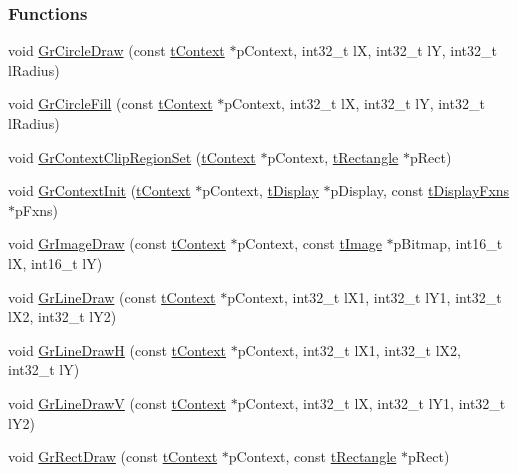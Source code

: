 \subsubsection*{Functions}
\begin{DoxyCompactItemize}
\item 
void \hyperlink{group__primitives__api_ga250a28f4ff03f530efc071cb17ff95f9}{Gr\+Circle\+Draw} (const \hyperlink{structt_context}{t\+Context} $\ast$p\+Context, int32\+\_\+t l\+X, int32\+\_\+t l\+Y, int32\+\_\+t l\+Radius)
\item 
void \hyperlink{group__primitives__api_gae63723bf4d75dbefcd59ca8e446fbd60}{Gr\+Circle\+Fill} (const \hyperlink{structt_context}{t\+Context} $\ast$p\+Context, int32\+\_\+t l\+X, int32\+\_\+t l\+Y, int32\+\_\+t l\+Radius)
\item 
void \hyperlink{group__primitives__api_ga8ecc647f885239b856665980779445b1}{Gr\+Context\+Clip\+Region\+Set} (\hyperlink{structt_context}{t\+Context} $\ast$p\+Context, \hyperlink{structt_rectangle}{t\+Rectangle} $\ast$p\+Rect)
\item 
void \hyperlink{group__primitives__api_ga7c9ff90a0c7e396d7ecb06a40de9fdd5}{Gr\+Context\+Init} (\hyperlink{structt_context}{t\+Context} $\ast$p\+Context, \hyperlink{structt_display}{t\+Display} $\ast$p\+Display, const \hyperlink{structt_display_fxns}{t\+Display\+Fxns} $\ast$p\+Fxns)
\item 
void \hyperlink{group__primitives__api_gae16f80ae734ad48c7dcef7f4ddf63427}{Gr\+Image\+Draw} (const \hyperlink{structt_context}{t\+Context} $\ast$p\+Context, const \hyperlink{structt_image}{t\+Image} $\ast$p\+Bitmap, int16\+\_\+t l\+X, int16\+\_\+t l\+Y)
\item 
void \hyperlink{group__primitives__api_ga7ed57966b44a0a0a98dd8bd4b6082f62}{Gr\+Line\+Draw} (const \hyperlink{structt_context}{t\+Context} $\ast$p\+Context, int32\+\_\+t l\+X1, int32\+\_\+t l\+Y1, int32\+\_\+t l\+X2, int32\+\_\+t l\+Y2)
\item 
void \hyperlink{group__primitives__api_ga06d0d6023715ff5a1f4e447034dde14a}{Gr\+Line\+Draw\+H} (const \hyperlink{structt_context}{t\+Context} $\ast$p\+Context, int32\+\_\+t l\+X1, int32\+\_\+t l\+X2, int32\+\_\+t l\+Y)
\item 
void \hyperlink{group__primitives__api_ga6237372929e97fb869c5dc40d3c85014}{Gr\+Line\+Draw\+V} (const \hyperlink{structt_context}{t\+Context} $\ast$p\+Context, int32\+\_\+t l\+X, int32\+\_\+t l\+Y1, int32\+\_\+t l\+Y2)
\item 
void \hyperlink{group__primitives__api_ga3b5d3bd409d945ad5aa7f7151f291dfb}{Gr\+Rect\+Draw} (const \hyperlink{structt_context}{t\+Context} $\ast$p\+Context, const \hyperlink{structt_rectangle}{t\+Rectangle} $\ast$p\+Rect)

\end{DoxyCompactItemize}
